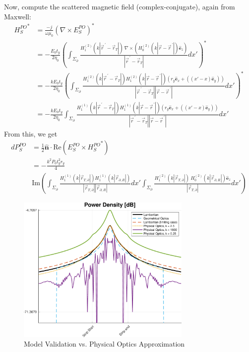 \documentclass{article}
\begin{document}
Now, compute the scattered magnetic field (complex-conjugate), again from Maxwell:
\begin{align}
   {H_S^{PO}}^* &= \frac{-j}{\omega \mu_0} \left(\nabla \times E_S^{PO} \right)^* \nonumber \\
   &= - \frac{E_0 t_y}{2 \eta_0} \left( \int_{\Sigma_{\partial}}
      \frac{H_1^{(2)}(k | \vec{r}^{\,\prime} - \vec{r}_T |) \ \nabla \times (
      H_0^{(2)}(k |\vec{r} - \vec{r}^{\,\prime}|)\hat{\mathbf{e}}_z)
      }{|\vec{r}^{\,\prime} - \vec{r}_T|} dx' \right)^* \nonumber \\
   &= - \frac{k E_0 t_y}{2 \eta_0} \left( \int_{\Sigma_{\partial}} \frac{H_1^{(2)}(k |
      \vec{r}^{\,\prime} - \vec{r}_T |)H_1^{(2)}(k |\vec{r} - \vec{r}^{\,\prime}|)
      (r_y \hat{\mathbf{e}}_x + ( (x' - x) \hat{\mathbf{e}}_y))}{|\vec{r}^{\,\prime}
      - \vec{r}_T| |\vec{r} - \vec{r}^{\,\prime}|} dx' \right)^* \nonumber \\
   &= - \frac{k E_0 t_y}{2 \eta_0} \int_{\Sigma_{\partial}} \frac{H_1^{(1)}(k |
      \vec{r}^{\,\prime} - \vec{r}_T |)H_1^{(1)}(k |\vec{r} - \vec{r}^{\,\prime}|)
      (r_y \hat{\mathbf{e}}_x + ( (x' - x) \hat{\mathbf{e}}_y))}{|\vec{r}^{\,\prime}
      - \vec{r}_T| |\vec{r} - \vec{r}^{\,\prime}|} dx' \nonumber
\end{align}
From this, we get 
{ \scriptsize
\begin{align}
   dP_S^{PO} &= \frac{1}{2} \hat{\mathbf{n}} \cdot \text{Re} ( E_S^{PO} \times
   {H_S^{PO}}^*) \nonumber \\
   &= - \frac{k^2 P_0 t_y^2 r_y}{4} \nonumber \\ 
   & \text{Im} \left( \int_{\Sigma_{\partial}}
      \frac{H_1^{(1)}(k | \vec{r}_{T,\partial} |)H_1^{(1)}(k |\vec{r}_{\partial,R}|)}{|\vec{r}_{T,\partial}| |\vec{r}_{\partial,R}|} dx' \int_{\Sigma_{\partial}} \frac{H_1^{(2)}(k |
      \vec{r}_{T,\partial} |) \ H_0^{(2)}(k |\vec{r}_{\partial,R}|)\hat{\mathbf{e}}_z }{|\vec{r}_{T,\partial}|} dx'
      \right)
   \label{eq:PowerDensityPO}
\end{align}
}
\begin{figure}[h]
   \begin{center}
      \includegraphics[width=0.75\textwidth]{../figures/PowerDensityValidation1.pdf}
   \end{center}
   \caption{Model Validation vs. Physical Optics Approximation}\label{fig:powerDensityValidation1}
\end{figure}
\end{document}
